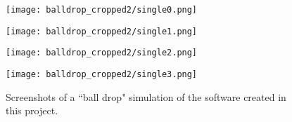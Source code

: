 \begin{figure}[H]
    \centering
    
    \begin{minipage}[t]{6.2cm}
        \centering
        \vspace{0pt}
        \texttt{[image: balldrop\_cropped2/single0.png]}
    \end{minipage}
    \begin{minipage}[t]{6.2cm}
        \centering
        \vspace{0pt}
        \texttt{[image: balldrop\_cropped2/single1.png]}
    \end{minipage}

    \vspace{0.5cm}

    \begin{minipage}[t]{6.2cm}
        \centering
        \vspace{0pt}
        \texttt{[image: balldrop\_cropped2/single2.png]}
    \end{minipage}
    \begin{minipage}[t]{6.2cm}
        \centering
        \vspace{0pt}
        \texttt{[image: balldrop\_cropped2/single3.png]}
    \end{minipage}

    \caption{Screenshots of a ``ball drop" simulation of the software created in this project.}
    \label{figure ball drop single}
\end{figure}

\newpage
\thispagestyle{empty}
\vspace*{-4cm}

